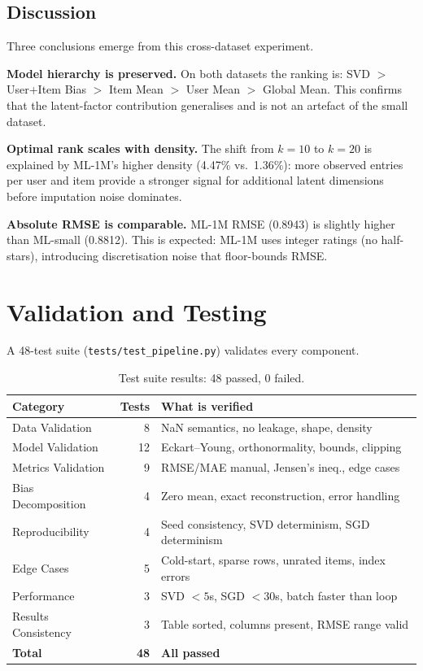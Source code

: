 \documentclass[12pt, a4paper]{article}
\newcommand{\file}[1]{\texttt{\small #1}}
\begin{document}
\subsection{Discussion}

Three conclusions emerge from this cross-dataset experiment.

\textbf{Model hierarchy is preserved.}  On both datasets the ranking is:
SVD $>$ User+Item Bias $>$ Item Mean $>$ User Mean $>$ Global Mean.
This confirms that the latent-factor contribution generalises and is not
an artefact of the small dataset.

\textbf{Optimal rank scales with density.}  The shift from $k=10$ to $k=20$
is explained by ML-1M's higher density (4.47\% vs.\ 1.36\%): more observed
entries per user and item provide a stronger signal for additional latent
dimensions before imputation noise dominates.

\textbf{Absolute RMSE is comparable.}  ML-1M RMSE (0.8943) is slightly
higher than ML-small (0.8812).  This is expected: ML-1M uses integer ratings
(no half-stars), introducing discretisation noise that floor-bounds RMSE.

\section{Validation and Testing}
\label{sec:testing}

A 48-test suite (\file{tests/test\_pipeline.py}) validates every component.

\begin{table}[h!]
\centering
\caption{Test suite results: 48 passed, 0 failed.}
\begin{tabular}{lrl}
\toprule
\textbf{Category} & \textbf{Tests} & \textbf{What is verified} \\
\midrule
Data Validation      & 8  & NaN semantics, no leakage, shape, density \\
Model Validation     & 12 & Eckart--Young, orthonormality, bounds, clipping \\
Metrics Validation   & 9  & RMSE/MAE manual, Jensen's ineq., edge cases \\
Bias Decomposition   & 4  & Zero mean, exact reconstruction, error handling \\
Reproducibility      & 4  & Seed consistency, SVD determinism, SGD determinism \\
Edge Cases           & 5  & Cold-start, sparse rows, unrated items, index errors \\
Performance          & 3  & SVD $<5$s, SGD $<30$s, batch faster than loop \\
Results Consistency  & 3  & Table sorted, columns present, RMSE range valid \\
\midrule
\textbf{Total}       & \textbf{48} & \textbf{All passed} \\
\bottomrule
\end{tabular}
\end{table}
\end{document}
